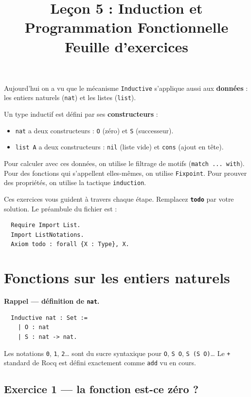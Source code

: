 \documentclass[11pt,a4paper]{article}
\title{%
  \vspace{-1.5cm}%
  \textbf{Leçon 5 : Induction et Programmation Fonctionnelle}\\[0.4em]
  \large Feuille d'exercices%
}
\date{}
\author{}
\newenvironment{rappel}{
\begin{mdframed}[style=rappelstyle]}{
\end{mdframed}}
\newcommand{\cq}[1]{\texttt{#1}}
\newcommand{\todoph}{\textcolor{todofg}{\textbf{\texttt{todo}}}}
\begin{document}
\maketitle
\vspace{-1.2cm}

Aujourd'hui on a vu que le mécanisme \cq{Inductive} s'applique aussi aux
\textbf{données} : les entiers naturels (\cq{nat}) et les listes (\cq{list}).

Un type inductif est défini par ses \textbf{constructeurs} :
\begin{itemize}[noitemsep,topsep=2pt]
  \item \cq{nat} a deux constructeurs : \cq{O} (zéro) et \cq{S} (successeur).
  \item \cq{list A} a deux constructeurs : \cq{nil} (liste vide) et \cq{cons}
    (ajout en tête).
\end{itemize}

Pour calculer avec ces données, on utilise le filtrage de motifs
(\cq{match ... with}). Pour des fonctions qui s'appellent elles-mêmes,
on utilise \cq{Fixpoint}. Pour prouver des propriétés, on utilise la
tactique \cq{induction}.

Ces exercices vous guident à travers chaque étape.
Remplacez \todoph{} par votre solution.
Le préambule du fichier est :

\begin{verbatim}
  Require Import List.
  Import ListNotations.
  Axiom todo : forall {X : Type}, X.
\end{verbatim}

\section{Fonctions sur les entiers naturels}

\begin{rappel}
  \textbf{Rappel — définition de \cq{nat}.}
\begin{verbatim}
  Inductive nat : Set :=
    | O : nat
    | S : nat -> nat.
\end{verbatim}
  Les notations \cq{0}, \cq{1}, \cq{2}\ldots{} sont du sucre syntaxique pour
  \cq{O}, \cq{S O}, \cq{S (S O)}\ldots{}
  Le \cq{+} standard de Rocq est défini exactement comme \cq{add} vu en cours.
\end{rappel}

\subsection{Exercice 1 — la fonction \og est-ce zéro ? \fg{}}
\end{document}
